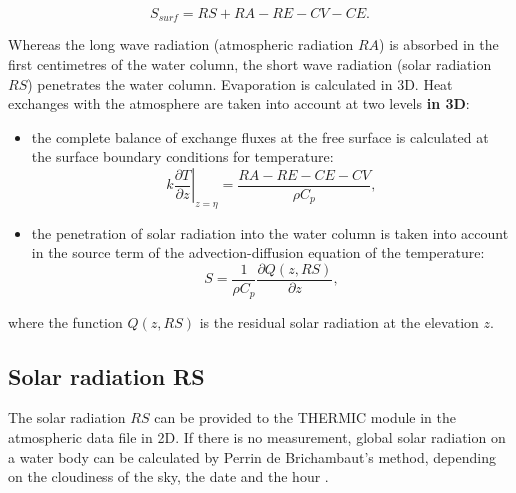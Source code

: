 \begin{equation}
  S_{surf} = RS + RA - RE - CV - CE.
\end{equation}

Whereas the long wave radiation (atmospheric radiation $RA$) is absorbed in
the first centimetres of the water column, the short wave radiation (solar
radiation $RS$) penetrates the water column. Evaporation is calculated in 3D.
Heat exchanges with the atmosphere are taken into account at two levels \textbf{in 3D}:
\begin{itemize}
\item the complete balance of exchange fluxes at the free surface is
calculated at the surface boundary conditions for temperature:
\begin{equation}
k \left.  \dfrac{\partial T}{\partial z}\right|_{z=\eta} =
\dfrac{RA-RE-CE-CV}{\rho C_p},
\end{equation}
\item the penetration of solar radiation into the water column is taken into
account in the source term of the advection-diffusion equation of the
temperature:
\begin{equation}
S=\dfrac{1}{\rho C_p}\dfrac{\partial Q(z,RS)}{\partial z},
\end{equation}
\end{itemize}
where the function $Q(z, RS)$ is the residual solar radiation at the elevation $z$.

\subsection{Solar radiation RS}

The solar radiation $RS$ can be provided to the THERMIC module
in the atmospheric data file in 2D.
If there is no measurement, global solar radiation on a water body
can be calculated by Perrin de Brichambaut's method,
depending on the cloudiness of the sky, the date and the hour
\cite{klein_ray_solaire_1979}.\\

